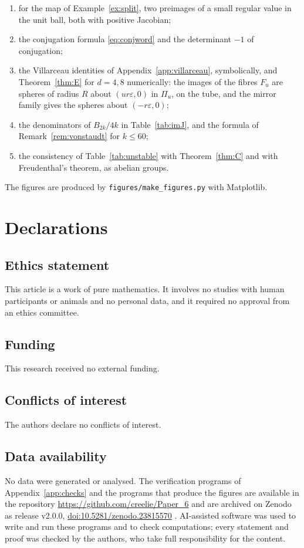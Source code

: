 \documentclass[11pt]{amsart}
\numberwithin{equation}{section}
\theoremstyle{plain}
\theoremstyle{definition}
\theoremstyle{remark}
\begin{document}
\begin{enumerate}[label=(\arabic*)]
\item for the map of Example~\ref{ex:split}, two preimages of a small regular value in the unit ball, both with positive Jacobian;
\item the conjugation formula \eqref{eq:conjword} and the determinant $-1$ of conjugation;
\item the Villarceau identities of Appendix~\ref{app:villarceau}, symbolically, and Theorem~\ref{thm:E} for $d=4,8$ numerically: the images of the fibres $F_u$ are spheres of radius $R$ about $(ur\varepsilon,0)$ in $\Pi_u$, on the tube, and the mirror family gives the spheres about $(-r\varepsilon,0)$;
\item the denominators of $B_{2k}/4k$ in Table~\ref{tab:imJ}, and the formula of Remark~\ref{rem:vonstaudt} for $k\le60$;
\item the consistency of Table~\ref{tab:unstable} with Theorem~\ref{thm:C} and with Freudenthal's theorem, as abelian groups.
\end{enumerate}
The figures are produced by \texttt{figures/make\_figures.py} with Matplotlib.
\section*{Declarations}

\subsection*{Ethics statement}
This article is a work of pure mathematics. It involves no studies with human participants or animals and no personal data, and it required no approval from an ethics committee.

\subsection*{Funding}
This research received no external funding.

\subsection*{Conflicts of interest}
The authors declare no conflicts of interest.

\subsection*{Data availability}
No data were generated or analysed. The verification programs of Appendix~\ref{app:checks} and the programs that produce the figures are available in the repository \url{https://github.com/creelie/Paper_6} and are archived on Zenodo as release v2.0.0, \href{https://doi.org/10.5281/zenodo.23815570}{doi:10.5281/zenodo.23815570} \cite{BB26}. AI-assisted software was used to write and run these programs and to check computations; every statement and proof was checked by the authors, who take full responsibility for the content.
\end{document}
